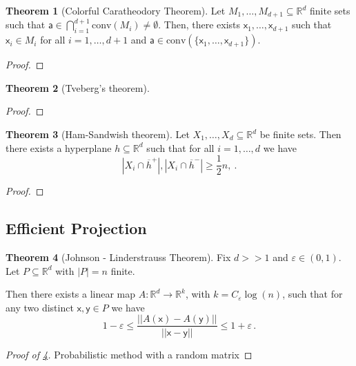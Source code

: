 \documentclass[12pt]{amsart}
\theoremstyle{definition}
\newtheorem{thm}{Theorem}[section]
\newcommand{\R}{\mathbb{R}}
\newcommand{\vx}{\mathsf{x}}
\newcommand{\vy}{\mathsf{y}}
\newcommand{\va}{\mathsf{a}}
\newcommand{\conv}{\mathrm{conv}}
\begin{document}
\begin{thm}[Colorful Caratheodory Theorem]
Let $M_1, \ldots, M_{d+1} \subseteq \R^d$ finite sets such that $\va \in \bigcap_{i = 1}^{d+1} \conv (M_i) \neq \emptyset$.
Then, there exists $\vx_1, \dots, \vx_{d+1}$ such that $\vx_i \in M_i$ for all $i = 1, \ldots, d+1$ and $\va \in \conv (\{\vx_1, \ldots, \vx_{d+1}\})$.
\end{thm}

\begin{proof}

\end{proof}


\begin{thm}[Tveberg's theorem]

\end{thm}


\begin{proof}

\end{proof}



\begin{thm}[Ham-Sandwish theorem]
Let $X_1 ,  \ldots , X_d \subseteq  \R^d$ be finite sets.
Then there exists a hyperplane $h \subseteq \R^d$ such that for all $i=1, \ldots, d$ we have 
$$ |X_i \cap \overline{h}^+| , |X_i \cap \overline{h}^-| \geq \frac{1}{2} n,\ . $$
\end{thm}

\begin{proof}

\end{proof}



\subsection{Efficient Projection}




\begin{thm}[Johnson - Linderstrauss Theorem]\label{thm:JL}
Fix $d >> 1$ and $\varepsilon \in (0, 1)$.
Let $P \subseteq \R^d$ with $|P| = n$ finite.

Then there exists a linear map $A:\R^d \to \R^k$, with $k = C_{\varepsilon} \log (n)$, such that for any two distinct $\vx, \vy \in P$ we have
$$ 1 - \varepsilon \leq \frac{||A(\vx) - A(\vy)||}{||\vx - \vy||} \leq 1 + \varepsilon \, . $$
\end{thm}

\begin{proof}[Proof of \cref{thm:JL}]%
Probabilistic method with a random matrix
\end{proof}
\end{document}
